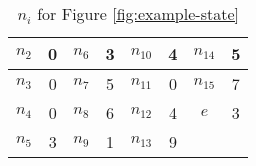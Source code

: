 \begin{table}[h]
  \centering
  \caption{$n_i$ for Figure \ref{fig:example-state}}\label{table1:n_i}
  \begin{tabular}{ c c c c c c c c }
    \hline
    $n_2$ & 0 & $n_6$ & 3 & $n_{10}$ & 4 & $n_{14}$ & 5  \\ \hline
    $n_3$ & 0 & $n_7$ & 5 & $n_{11}$ & 0 & $n_{15}$ & 7  \\ \hline
    $n_4$ & 0 & $n_8$ & 6 & $n_{12}$ & 4 & $e$      & 3  \\ \hline
    $n_5$ & 3 & $n_9$ & 1 & $n_{13}$ & 9 &          &    \\ \hline
  \end{tabular}
\end{table}
